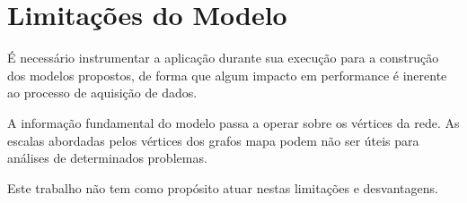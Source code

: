 
\section{Limitações do Modelo}

É necessário instrumentar a aplicação durante sua execução para a construção dos
modelos propostos, de forma que algum impacto em performance é inerente ao
processo de aquisição de dados.

A informação fundamental do modelo passa a operar sobre os vértices da rede. As
escalas abordadas pelos vértices dos grafos mapa podem não ser úteis para
análises de determinados problemas.

Este trabalho não tem como propósito atuar nestas limitações e desvantagens.
